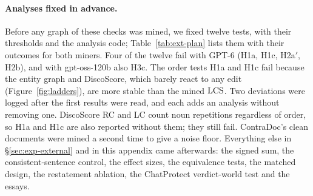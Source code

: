 \paragraph{Analyses fixed in advance.} Before any graph of these checks was mined, we fixed twelve
tests, with their thresholds and the analysis code; Table~\ref{tab:ext-plan} lists them with their
outcomes for both miners. Four of the twelve fail with GPT-6 (H1a, H1c, H2a$'$, H2b), and with
gpt-oss-120b also H3c. The order
tests H1a and H1c fail because the entity graph and DiscoScore, which barely react to any edit
(Figure~\ref{fig:ladders}), are more stable than the mined $\mathrm{LCS}$. Two deviations were logged after
the first results were read, and each adds an analysis without removing one. DiscoScore RC and LC
count noun repetitions regardless of order, so H1a and H1c are also reported without them; they
still fail. ContraDoc's clean documents were mined a second time to give a noise floor. Everything
else in \S\ref{sec:exp-external} and in this appendix came afterwards: the signed sum, the
consistent-sentence control, the effect sizes, the equivalence tests, the matched design, the
restatement ablation, the ChatProtect verdict-world test and the essays.


